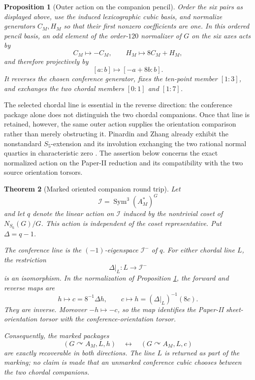 \documentclass[11pt]{article}
\newtheorem{theorem}{Theorem}[section]
\newtheorem{proposition}[theorem]{Proposition}
\theoremstyle{definition}
\theoremstyle{remark}
\newcommand{\Sym}{\operatorname{Sym}}
\begin{document}
\begin{proposition}[Outer action on the companion pencil]
\label{prop:outer-pencil-action}
Order the six pairs as displayed above, use the induced lexicographic cubic
basis, and normalize generators \(C_M,H_M\) so that their first nonzero
coefficients are one.  In this ordered pencil basis, an odd element of the
order-\(120\) normalizer of \(G\) on the six axes acts by
\[
 C_M\longmapsto-C_M,\qquad H_M\longmapsto8C_M+H_M,
\]
and therefore projectively by
\[
 [a:b]\longmapsto[-a+8b:b].
\]
It reverses the chosen conference generator, fixes the ten-point member
\([1:3]\), and exchanges the two chordal members \([0:1]\) and \([1:7]\).
\end{proposition}

The selected chordal line is essential in the reverse direction: the
conference package alone does not distinguish the two chordal companions.
Once that line is retained, however, the same outer action supplies the
orientation comparison rather than merely obstructing it.  Pinardin and
Zhang already exhibit the nonstandard \(S_5\)-extension and its involution
exchanging the two rational normal quartics in characteristic zero
\cite[\S8.2]{PinardinZhang2025}.  The assertion below concerns the exact
normalized action on the Paper-II reduction and its compatibility with the
two source orientation torsors.

\begin{theorem}[Marked oriented companion round trip]
\label{thm:marked-oriented-round-trip}
Let
\[
 \mathcal I=\Sym^3(A_M^*)^G
\]
and let \(q\) denote the linear action on \(\mathcal I\) induced by the
nontrivial coset of \(N_{S_6}(G)/G\).  This action is independent of the
coset representative.  Put \(\Delta=q-1\).

The conference line is the \((-1)\)-eigenspace \(\mathcal I^-\) of \(q\).
For either chordal line \(L\), the restriction
\[
 \Delta|_L:L\longrightarrow\mathcal I^-
\]
is an isomorphism.  In the normalization of Proposition
\ref{prop:outer-pencil-action}, the forward and reverse maps are
\[
 h\longmapsto c=8^{-1}\Delta h,
 \qquad
 c\longmapsto h=(\Delta|_L)^{-1}(8c).
\]
They are inverse.  Moreover \(-h\mapsto-c\), so the map identifies the
Paper-II sheet-orientation torsor with the conference-orientation torsor.

Consequently, the marked packages
\[
 (G\curvearrowright A_M,L,h)
 \quad\longleftrightarrow\quad
 (G\curvearrowright A_M,L,c)
\]
are exactly recoverable in both directions.  The line \(L\) is returned as
part of the marking; no claim is made that an unmarked conference cubic
chooses between the two chordal companions.
\end{theorem}
\end{document}
